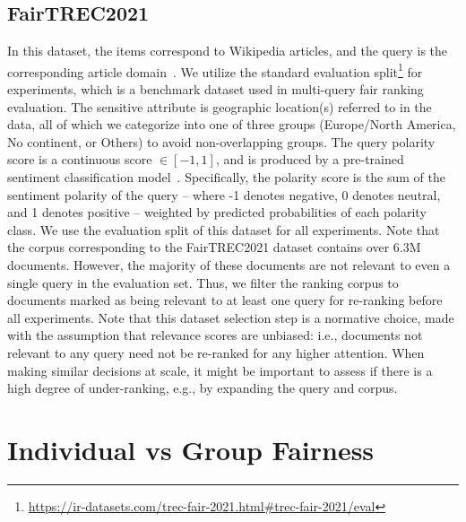\subsection{FairTREC2021}
In this dataset, the items correspond to Wikipedia articles, and the query is the corresponding article domain~\cite{trec-fair-ranking-2021}. We utilize the standard evaluation split\footnote{\url{https://ir-datasets.com/trec-fair-2021.html\#trec-fair-2021/eval}} for experiments, which is a benchmark dataset used in multi-query fair ranking evaluation. The sensitive attribute is geographic location(s) referred to in the data, all of which we categorize into one of three groups (Europe/North America, No continent, or Others) to avoid non-overlapping groups. The query polarity score is a continuous score $\in [-1,1]$, and is produced by a pre-trained sentiment classification model~\cite{barbieri-etal-2020-tweeteval}. Specifically, the polarity score is the sum of the sentiment polarity of the query -- where -1 denotes negative, 0 denotes neutral, and 1 denotes positive -- weighted by predicted probabilities of each polarity class. We use the evaluation split of this dataset for all experiments. Note that the corpus corresponding to the FairTREC2021 dataset contains over 6.3M documents. However, the majority of these documents are not relevant to even a single query in the evaluation set. Thus, we filter the ranking corpus to documents marked as being relevant to at least one query for re-ranking before all experiments. Note that this dataset selection step is a normative choice, made with the assumption that relevance scores are unbiased: i.e., documents not relevant to any query need not be re-ranked for any higher attention. When making similar decisions at scale, it might be important to assess if there is a high degree of under-ranking, e.g., by expanding the query and corpus.

\section{Individual vs Group Fairness}








